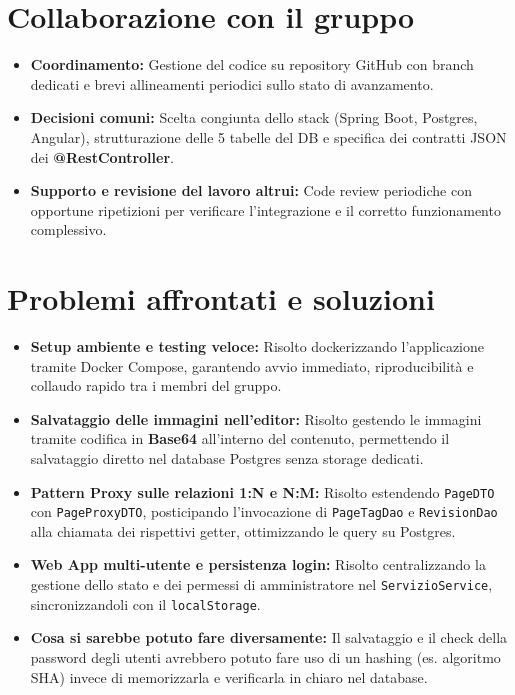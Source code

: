 \documentclass[11pt,a4paper]{article}
\begin{document}
\section{Collaborazione con il gruppo}
\begin{itemize}
    \item \textbf{Coordinamento:} Gestione del codice su repository GitHub con branch dedicati e brevi allineamenti periodici sullo stato di avanzamento.
    \item \textbf{Decisioni comuni:} Scelta congiunta dello stack (Spring Boot, Postgres, Angular), strutturazione delle 5 tabelle del DB e specifica dei contratti JSON dei \textbf{@RestController}.
    \item \textbf{Supporto e revisione del lavoro altrui:} Code review periodiche con opportune ripetizioni per verificare l'integrazione e il corretto funzionamento complessivo.
\end{itemize}

\section{Problemi affrontati e soluzioni}
\begin{itemize}
    \item \textbf{Setup ambiente e testing veloce:} Risolto dockerizzando l'applicazione tramite Docker Compose, garantendo avvio immediato, riproducibilità e collaudo rapido tra i membri del gruppo.
    \item \textbf{Salvataggio delle immagini nell'editor:} Risolto gestendo le immagini tramite codifica in \textbf{Base64} all'interno del contenuto, permettendo il salvataggio diretto nel database Postgres senza storage dedicati.
    \item \textbf{Pattern Proxy sulle relazioni 1:N e N:M:} Risolto estendendo \texttt{PageDTO} con \texttt{PageProxyDTO}, posticipando l'invocazione di \texttt{PageTagDao} e \texttt{RevisionDao} alla chiamata dei rispettivi getter, ottimizzando le query su Postgres.
    \item \textbf{Web App multi-utente e persistenza login:} Risolto centralizzando la gestione dello stato e dei permessi di amministratore nel \texttt{ServizioService}, sincronizzandoli con il \texttt{localStorage}.
    \item \textbf{Cosa si sarebbe potuto fare diversamente:} Il salvataggio e il check della password degli utenti avrebbero potuto fare uso di un hashing (es. algoritmo SHA) invece di memorizzarla e verificarla in chiaro nel database.
\end{itemize}
\end{document}
